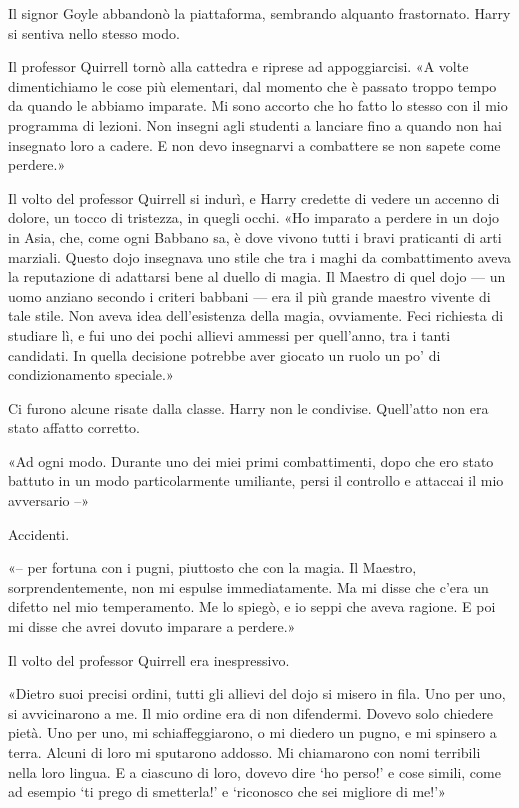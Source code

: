 Il signor Goyle abbandonò la piattaforma, sembrando alquanto frastornato. Harry si sentiva nello stesso modo.

Il professor Quirrell tornò alla cattedra e riprese ad appoggiarcisi. «A volte dimentichiamo le cose più elementari, dal momento che è passato troppo tempo da quando le abbiamo imparate. Mi sono accorto che ho fatto lo stesso con il mio programma di lezioni. Non insegni agli studenti a lanciare fino a quando non hai insegnato loro a cadere. E non devo insegnarvi a combattere se non sapete come perdere.»

Il volto del professor Quirrell si indurì, e Harry credette di vedere un accenno di dolore, un tocco di tristezza, in quegli occhi. «Ho imparato a perdere in un dojo in Asia, che, come ogni Babbano sa, è dove vivono tutti i bravi praticanti di arti marziali. Questo dojo insegnava uno stile che tra i maghi da combattimento aveva la reputazione di adattarsi bene al duello di magia. Il Maestro di quel dojo — un uomo anziano secondo i criteri babbani — era il più grande maestro vivente di tale stile. Non aveva idea dell’esistenza della magia, ovviamente. Feci richiesta di studiare lì, e fui uno dei pochi allievi ammessi per quell’anno, tra i tanti candidati. In quella decisione potrebbe aver giocato un ruolo un po’ di condizionamento speciale.»

Ci furono alcune risate dalla classe. Harry non le condivise. Quell’atto non era stato affatto corretto.

«Ad ogni modo. Durante uno dei miei primi combattimenti, dopo che ero stato battuto in un modo particolarmente umiliante, persi il controllo e attaccai il mio avversario –»

Accidenti.

«– per fortuna con i pugni, piuttosto che con la magia. Il Maestro, sorprendentemente, non mi espulse immediatamente. Ma mi disse che c’era un difetto nel mio temperamento. Me lo spiegò, e io seppi che aveva ragione. E poi mi disse che avrei dovuto imparare a perdere.»

Il volto del professor Quirrell era inespressivo.

«Dietro suoi precisi ordini, tutti gli allievi del dojo si misero in fila. Uno per uno, si avvicinarono a me. Il mio ordine era di non difendermi. Dovevo solo chiedere pietà. Uno per uno, mi schiaffeggiarono, o mi diedero un pugno, e mi spinsero a terra. Alcuni di loro mi sputarono addosso. Mi chiamarono con nomi terribili nella loro lingua. E a ciascuno di loro, dovevo dire ‘ho perso!’ e cose simili, come ad esempio ‘ti prego di smetterla!’ e ‘riconosco che sei migliore di me!’»

